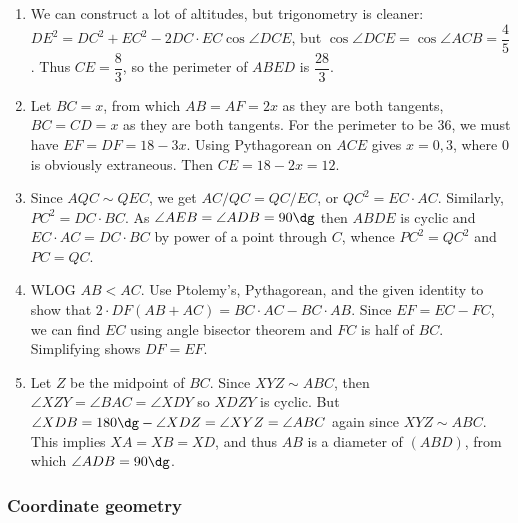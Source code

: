 \documentclass[10pt,paper=letter]{scrartcl}
\begin{document}
\begin{enumerate}

\item We can construct a lot of altitudes, but trigonometry is cleaner: $DE^2 = DC^2 + EC^2 - 2DC\cdot EC \cos \angle DCE$, but $\cos \angle DCE = \cos \angle ACB = \dfrac45$. Thus $CE = \dfrac83$, so the perimeter of $ABED$ is $\dfrac{28}3$.

\item Let $BC = x$, from which $AB = AF = 2x$ as they are both tangents, $BC = CD = x$ as they are both tangents. For the perimeter to be $36$, we must have $EF = DF = 18 - 3x$. Using Pythagorean on $ACE$ gives $x = 0, 3$, where $0$ is obviously extraneous. Then $CE = 18-2x = 12$.

\item Since $AQC \sim QEC$, we get $AC / QC = QC / EC$, or $QC^2 = EC \cdot AC$. Similarly, $PC^2 = DC \cdot BC$. As $\angle AEB = \angle ADB = 90\dg$ then $ABDE$ is cyclic and $EC \cdot AC = DC \cdot BC$ by power of a point through $C$, whence $PC^2 = QC^2$ and $PC = QC$.

\item WLOG $AB < AC$. Use Ptolemy's, Pythagorean, and the given identity to show that $2 \cdot DF (AB + AC) = BC \cdot AC - BC \cdot AB$. Since $EF = EC - FC$, we can find $EC$ using angle bisector theorem and $FC$ is half of $BC$. Simplifying shows $DF = EF$.

\item Let $Z$ be the midpoint of $BC$. Since $XYZ \sim ABC$, then $\angle XZY = \angle BAC = \angle XDY$ so $XDZY$ is cyclic. But $\angle XDB = 180\dg - \angle XDZ = \angle XYZ = \angle ABC$ again since $XYZ \sim ABC$. This implies $XA = XB = XD$, and thus $AB$ is a diameter of $(ABD)$, from which $\angle ADB = 90\dg$.

\end{enumerate}

\subsubsection*{Coordinate geometry}
\end{document}
